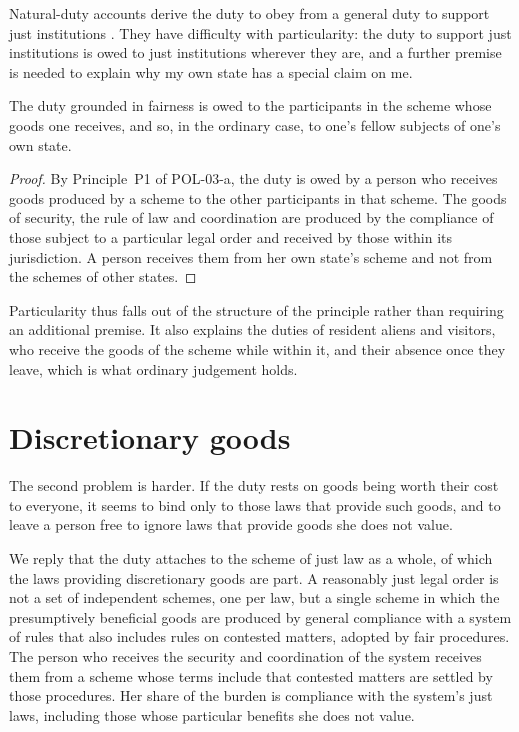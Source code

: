 \documentclass{situationist-preprint}
\begin{document}
Natural-duty accounts derive the duty to obey from a general duty to support just institutions \citep[\S 19]{Rawls1971}. They have difficulty with particularity: the duty to support just institutions is owed to just institutions wherever they are, and a further premise is needed to explain why my own state has a special claim on me.

\begin{proposition}\label{p:particular}
The duty grounded in fairness is owed to the participants in the scheme whose goods one receives, and so, in the ordinary case, to one's fellow subjects of one's own state.
\end{proposition}

\begin{proof}
By Principle~P1 of POL-03-a, the duty is owed by a person who receives goods produced by a scheme to the other participants in that scheme. The goods of security, the rule of law and coordination are produced by the compliance of those subject to a particular legal order and received by those within its jurisdiction. A person receives them from her own state's scheme and not from the schemes of other states.
\end{proof}

Particularity thus falls out of the structure of the principle rather than requiring an additional premise. It also explains the duties of resident aliens and visitors, who receive the goods of the scheme while within it, and their absence once they leave, which is what ordinary judgement holds.

\section{Discretionary goods}

The second problem is harder. If the duty rests on goods being worth their cost to everyone, it seems to bind only to those laws that provide such goods, and to leave a person free to ignore laws that provide goods she does not value.

We reply that the duty attaches to the scheme of just law as a whole, of which the laws providing discretionary goods are part. A reasonably just legal order is not a set of independent schemes, one per law, but a single scheme in which the presumptively beneficial goods are produced by general compliance with a system of rules that also includes rules on contested matters, adopted by fair procedures. The person who receives the security and coordination of the system receives them from a scheme whose terms include that contested matters are settled by those procedures. Her share of the burden is compliance with the system's just laws, including those whose particular benefits she does not value.
\end{document}
